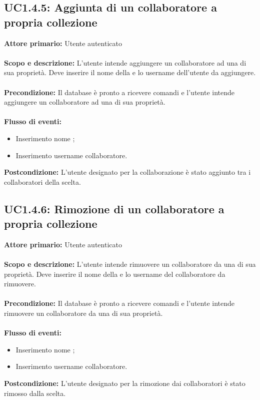 \documentclass{scalatekids-article}
\begin{document}
\subsection{UC1.4.5: Aggiunta di un collaboratore a propria collezione}
\textbf{Attore primario:} Utente autenticato\\ \\
\textbf{Scopo e descrizione:} L'utente intende aggiungere un collaboratore ad una  di sua proprietà. Deve inserire il nome della  e lo username dell'utente da aggiungere.\\ \\
\textbf{Precondizione:} Il database è pronto a ricevere comandi e l'utente intende aggiungere un collaboratore ad una  di sua proprietà.\\ \\
\textbf{Flusso di eventi:}
\begin{itemize}
\item Inserimento nome ;
\item Inserimento username collaboratore.
\end{itemize}
\textbf{Postcondizione:} L'utente designato per la collaborazione è stato aggiunto tra i collaboratori della  scelta.
\subsection{UC1.4.6: Rimozione di un collaboratore a propria collezione}
\textbf{Attore primario:} Utente autenticato\\ \\
\textbf{Scopo e descrizione:} L'utente intende rimuovere un collaboratore da una  di sua proprietà. Deve inserire il nome della  e lo username del collaboratore da rimuovere.\\ \\
\textbf{Precondizione:} Il database è pronto a ricevere comandi e l'utente intende rimuovere un collaboratore da una  di sua proprietà.\\ \\
\textbf{Flusso di eventi:}
\begin{itemize}
\item Inserimento nome ;
\item Inserimento username collaboratore.
\end{itemize}
\textbf{Postcondizione:} L'utente designato per la rimozione dai collaboratori è stato rimosso dalla  scelta.
\end{document}
